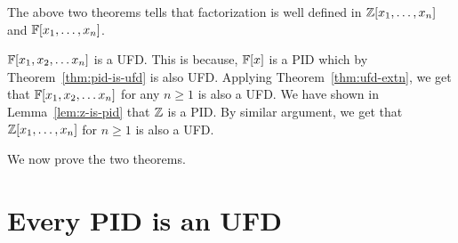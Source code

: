 The above two theorems tells that factorization is well defined in
${\mathbb{Z}}[x_1,\ldots,x_n]$ and ${\mathbb{F}}[x_1,\ldots,x_n]$.
\begin{corollary}
	${\mathbb{F}[x_1,x_2, \ldots x_n]}$ is a UFD. This is because, ${\mathbb{F}}[x]$ is a PID which by
		Theorem~\ref{thm:pid-is-ufd} is also UFD. Applying
		Theorem~\ref{thm:ufd-extn}, we get that ${\mathbb{F}[x_1,x_2, \ldots x_n]}$ for any $n
		\ge 1$ is also a UFD. We have shown in 
		Lemma~\ref{lem:z-is-pid} that ${\mathbb{Z}}$ is a PID. By similar
		argument, we get that ${\mathbb{Z}}[x_1,\ldots,x_n]$ for $n \ge
		1$ is also a UFD.
\end{corollary}

We now prove the two theorems.
\section{Every PID is an UFD}

